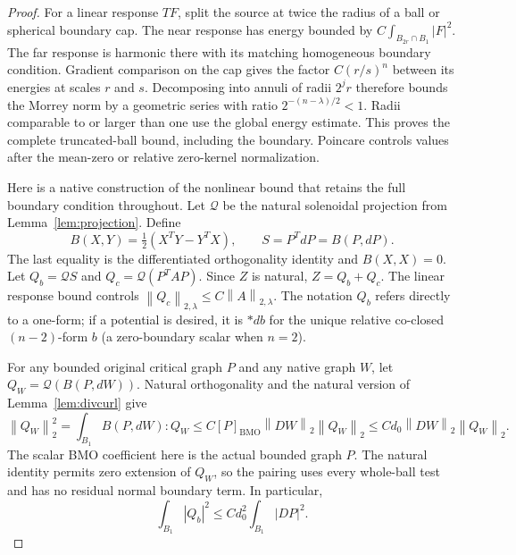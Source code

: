 \documentclass[reqno,11pt]{amsart}
\numberwithin{equation}{section}
\theoremstyle{definition}
\theoremstyle{remark}
\newcommand{\BMO}{\mathrm{BMO}}
\newcommand{\norm}[1]{\left\lVert#1\right\rVert}
\begin{document}
\begin{proof}
For a linear response $TF$, split the source at twice the radius of a
ball or spherical boundary cap. The near response has energy bounded
by $C\int_{B_{2r}\cap B_1}|F|^2$. The far response is harmonic there
with its matching homogeneous boundary condition. Gradient comparison
on the cap gives the factor $C(r/s)^n$ between its energies at scales
$r$ and $s$. Decomposing into annuli of radii $2^jr$ therefore bounds
the Morrey norm by a geometric series with ratio
$2^{-(n-\lambda)/2}<1$. Radii comparable to or larger than one use
the global energy estimate. This proves the complete truncated-ball
bound, including the boundary. Poincare controls values after the
mean-zero or relative zero-kernel normalization.

Here is a native construction of the nonlinear bound that retains
the full boundary condition throughout. Let $\mathcal Q$ be the
natural solenoidal projection from Lemma~\ref{lem:projection}. Define
\[
 B(X,Y)=\tfrac12(X^TY-Y^TX),\qquad S=P^TdP=B(P,dP).
\]
The last equality is the differentiated orthogonality identity and
$B(X,X)=0$. Let $Q_b=\mathcal Q S$ and
$Q_c=\mathcal Q(P^TAP)$. Since $Z$ is natural, $Z=Q_b+Q_c$.
The linear response bound controls
$\norm{Q_c}_{2,\lambda}\leq C\norm A_{2,\lambda}$.
The notation $Q_b$ refers directly to a one-form; if a potential is
desired, it is $*db$ for the unique relative co-closed $(n-2)$-form
$b$ (a zero-boundary scalar when $n=2$).

For any bounded original critical graph $P$ and any native graph $W$,
let $Q_W=\mathcal Q(B(P,dW))$. Natural orthogonality and the natural
version of Lemma~\ref{lem:divcurl} give
\begin{equation}\label{eq:nonlinear-full-energy}
 \norm{Q_W}_2^2=\int_{B_1}B(P,dW):Q_W
 \leq C[P]_{\BMO}\norm{DW}_2\norm{Q_W}_2
 \leq Cd_0\norm{DW}_2\norm{Q_W}_2.
\end{equation}
The scalar BMO coefficient here is the actual bounded graph $P$.
The natural identity permits zero extension of $Q_W$, so the pairing
uses every whole-ball test and has no residual normal boundary term.
In particular,
\begin{equation}\label{eq:nonlinear-global}
 \int_{B_1}|Q_b|^2\leq Cd_0^2\int_{B_1}|DP|^2.
\end{equation}


\end{proof}
\end{document}
